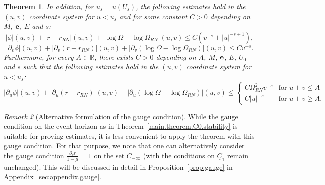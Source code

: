 \documentclass[10pt, reqno]{amsart}
\newtheorem{theorem}{Theorem}[section]
\theoremstyle{definition}
\theoremstyle{remark}
\newtheorem{remark}[theorem]{Remark}
\numberwithin{equation}{section}
\newcommand{\rd}{\partial}
\newcommand{\0}{\emptyset}
\newcommand{\Omg}{\Omega}
\newcommand{\f}{\frac}
\begin{document}
\begin{theorem}
In addition, for $u_s=u(U_s)$, the following estimates hold in the $(u,v)$ coordinate system for $u<u_s$ and for some constant $C>0$ depending on $M$, ${\bf e}$, $E$ and $s$:
$$|\phi|(u,v)+|r-r_{RN}|(u,v)+|\log\Omg-\log\Omg_{RN}|(u,v) \leq C(v^{-s}+|u|^{-s+1}),$$
$$|\rd_v\phi|(u,v)+|\rd_v(r-r_{RN})|(u,v)+|\rd_v(\log\Omg-\log\Omg_{RN})|(u,v) \leq Cv^{-s}.$$
Furthermore, for every $A\in \mathbb R$, there exists $C>0$ depending on $A$, $M$, ${\bf e}$, $E$, $U_0$ and $s$ such that the following estimates hold in the $(u,v)$ coordinate system for $u<u_s$:
$$|\rd_u\phi|(u,v)+|\rd_u(r-r_{RN})|(u,v)+|\rd_u(\log\Omg-\log\Omg_{RN})|(u,v) \leq 
\begin{cases}
C\Omg_{RN}^2 v^{-s} &\mbox{for }u+v\leq A\\
C|u|^{-s} &\mbox{for }u+v\geq A.
\end{cases}
$$
\end{theorem}

\begin{remark}[Alternative formulation of the gauge condition]\label{gauge.equiv}
While the gauge condition on the event horizon as in Theorem~\ref{main.theorem.C0.stability} is suitable for proving estimates, it is less convenient to apply the theorem with this gauge condition. For that purpose, we note that one can alternatively consider the gauge condition $\f{\rd_v r}{1-\mu}=1$ on the set $C_{-\infty}$ (with the conditions on $\underline{C}_1$ remain unchanged). This will be discussed in detail in Proposition~\ref{prop:gauge} in Appendix~\ref{sec:appendix.gauge}.
\end{remark}
\end{document}
